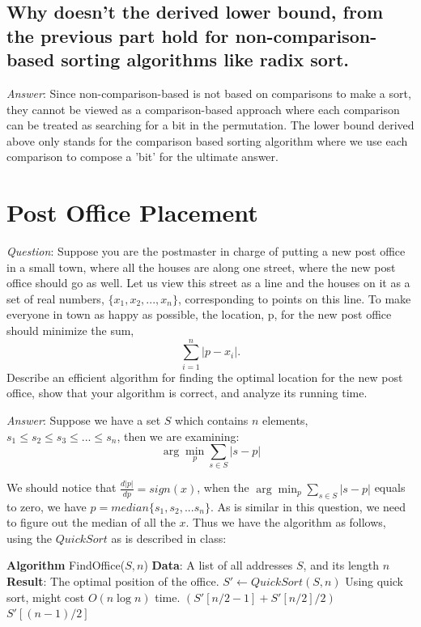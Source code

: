 \documentclass[11pt]{article}
\begin{document}
\subsection{Why doesn't the derived lower bound, from the previous part hold for non-comparison-based sorting algorithms like radix sort.}
\noindent \emph{Answer}: Since non-comparison-based is not based on comparisons to make a sort, they cannot be viewed as a comparison-based approach where each comparison can be treated as searching for a bit in the permutation. The lower bound derived above only stands for the comparison based sorting algorithm where we use each comparison to compose a 'bit' for the ultimate answer.
\section{Post Office Placement}
\noindent \emph{Question}: Suppose you are the postmaster in charge of putting a new post office in a small town, where all the houses are along one street, where the new post office should go as well. Let us view this street as a line and the houses on it as a set of real numbers, $\{x_1, x_2, . . . , x_n\}$, corresponding to points on this line. To make everyone in town as happy as possible, the location, p, for the new post office should minimize the sum,
\begin{equation*}
	\sum_{i=1}^{n} |p-x_i|.
\end{equation*}
Describe an efficient algorithm for finding the optimal location for the new post office, show that your algorithm is correct, and analyze its running time.

\noindent \emph{Answer}: Suppose we have a set $S$ which contains $n$ elements, $s_1\leq s_2\leq s_3\leq ... \leq s_n$, then we are examining:
\begin{equation*}
	\arg \min_{p} \sum_{s\in S} |s-p|
\end{equation*}

We should notice that $\frac{d |p|}{d p}=sign (x)$, when the $\arg \min_{p} \sum_{s\in S} |s-p|$ equals to zero, we have $p=median\{s_1,s_2,...s_n\}$. As is similar in this question, we need to figure out the median of all the $x$. Thus we have the algorithm as follows, using the $QuickSort$ as is described in class:
\begin{algorithmic}
	\State \textbf{Algorithm} FindOffice($S,n$)
	\State \textbf{Data}: A list of all addresses $S$, and its length $n$
	\State \textbf{Result}: The optimal position of the office.
	\State $S'\gets QuickSort(S,n)$ \Comment Using quick sort, might cost $O(n\log n)$ time.
		\State \Return $(S'[n/2-1]+S'[n/2]/2)$
	\Else
		\State \Return $S'[(n-1)/2]$ 
	\EndIf
\end{algorithmic}
\end{document}
